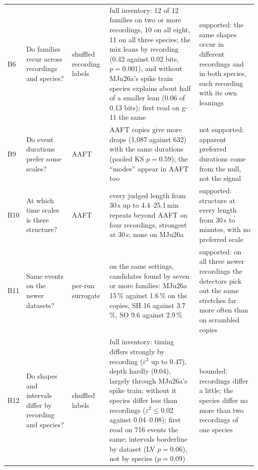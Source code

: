 \begin{table}[htbp]
\begin{tabularx}{\textwidth}{@{}l >{\raggedright\arraybackslash}X >{\raggedright\arraybackslash}p{1.9cm} >{\raggedright\arraybackslash}p{4.5cm} >{\raggedright\arraybackslash}p{3.5cm}@{}}
B6 & Do families recur across recordings and species? & shuffled recording labels & full inventory: 12 of 12 families on two or more recordings, 10 on all eight, 11 on all three species; the mix leans by recording (0.42 against 0.02 bits, $p=0.001$), and without MJu26a's spike train species explains about half of a smaller lean (0.06 of 0.13 bits); first read on g-11 the same & supported: the same shapes occur in different recordings and in both species, each recording with its own leanings\\
B9 & Do event durations prefer some scales? & AAFT & AAFT copies give more drops (1,087 against 632) with the same durations (pooled KS $p=0.59$); the ``modes'' appear in AAFT too & not supported: apparent preferred durations come from the null, not the signal\\
B10 & At which time scales is there structure? & AAFT & every judged length from 30\,s up to 4.4--25.1\,min repeats beyond AAFT on four recordings, strongest at 30\,s; none on MJu26a & supported: structure at every length from 30\,s to minutes, with no preferred scale\\
B11 & Same events on the newer datasets? & per-run surrogate & on the same settings, candidates found by seven or more families: MJu26a 15\,\% against 1.6\,\% on the copies, SH 16 against 3.7\,\%, SO 9.6 against 2.9\,\% & supported: on all three newer recordings the detectors pick out the same stretches far more often than on scrambled copies\\
B12 & Do shapes and intervals differ by recording and species? & shuffled labels & full inventory: timing differs strongly by recording ($\varepsilon^2$ up to 0.47), depth hardly (0.04), largely through MJu26a's spike train; without it species differ less than recordings ($\varepsilon^2\le0.02$ against 0.04--0.08); first read on 716 events the same; intervals borderline by dataset (LV $p=0.06$), not by species ($p=0.09$) & bounded: recordings differ a little; the species differ no more than two recordings of one species\\
\bottomrule
\end{tabularx}
\end{table}
